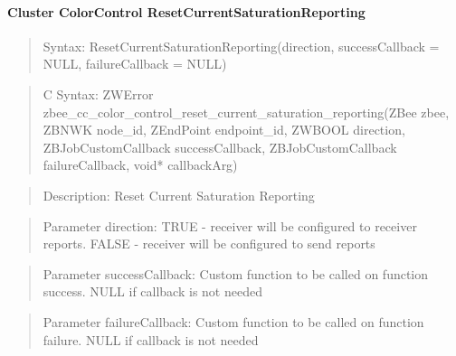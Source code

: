 \paragraph{Cluster ColorControl ResetCurrentSaturationReporting}
\begin{quote}Syntax: ResetCurrentSaturationReporting(direction, successCallback = NULL, failureCallback = NULL)\end{quote}
\begin{quote}C Syntax: ZWError zbee\_cc\_color\_control\_reset\_current\_saturation\_reporting(ZBee zbee, ZBNWK node\_id, ZEndPoint endpoint\_id, ZWBOOL direction, ZBJobCustomCallback successCallback, ZBJobCustomCallback failureCallback, void* callbackArg)\end{quote}
\begin{quote}Description: Reset Current Saturation Reporting\end{quote}
\begin{quote}Parameter direction: TRUE  - receiver will be configured to receiver reports. FALSE - receiver will be configured to send reports\end{quote}
\begin{quote}Parameter successCallback: Custom function to be called on function success. NULL if callback is not needed\end{quote}
\begin{quote}Parameter failureCallback: Custom function to be called on function failure. NULL if callback is not needed\end{quote}


